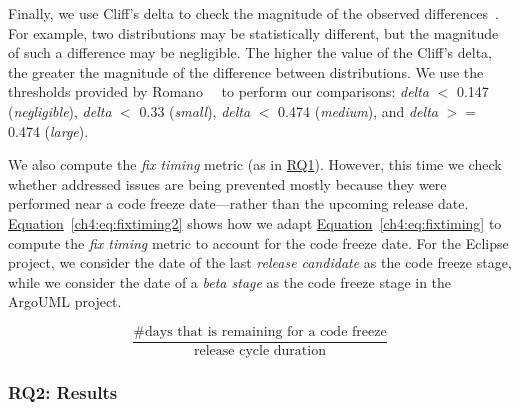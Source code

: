 Finally, we use Cliff's delta to check the magnitude of the observed
differences~\cite{cliff1993dominance}. For example, two distributions may be
statistically different, but the magnitude of such a difference may be
negligible. The higher the value of the Cliff's delta, the greater the magnitude
of the difference between distributions. We use the thresholds provided by
Romano~\etal~\cite{romano_2006} to perform our comparisons: {\em delta} $<$
0.147 ({\em negligible}), {\em delta} $<$ 0.33 ({\em small}), {\em delta} $<$
0.474 ({\em medium}), and {\em delta} $>=$ 0.474 ({\em large}).

We also compute the {\em fix timing} metric (as in \hyperref[ch4:rq1]{RQ1}).
However, this time we check whether addressed issues are being prevented mostly
because they were performed near a code freeze date---rather than the upcoming
release date. \hyperref[ch4:eq:fixtiming2]{Equation}~\ref{ch4:eq:fixtiming2} shows how
we adapt \hyperref[ch4:eq:fixtiming]{Equation}~\ref{ch4:eq:fixtiming} to compute the
{\em fix timing} metric to account for the code freeze date. For the Eclipse
project, we consider the date of the last {\em release candidate} as the code
freeze stage, while we consider the date of a {\em beta stage} as the code
freeze stage in the ArgoUML project.

\begin{equation}
	\frac{\text{\# days that is remaining for a code freeze}}{\text{release
	cycle duration}}
	\label{ch4:eq:fixtiming2}
\end{equation}

\subsubsection*{RQ2: Results}

